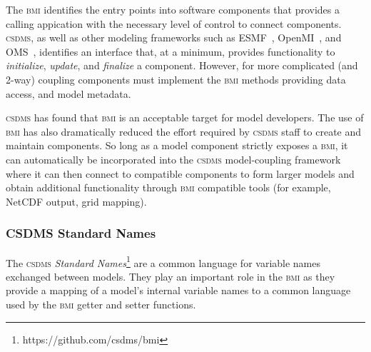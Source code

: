 \documentclass[11pt, oneside]{amsart}
\newcommand{\huttonnote}[1]{ {\textcolor{magenta}    { ***Eric:      #1 }}}
\DeclareRobustCommand{\csdms}{\textsc{csdms}}
\DeclareRobustCommand{\bmi}{\textsc{bmi}}
\begin{document}
The \bmi{} identifies the entry points into software components that provides a
calling appication with the necessary level of control to connect components.
\csdms, as well as other modeling frameworks such as
ESMF~\cite{hill2004architecture}, OpenMI~\cite{gregersen2007openmi}, and
OMS~\cite{david2002object}, identifies an interface that, at a minimum,
provides functionality to \emph{initialize}, \emph{update}, and
\emph{finalize} a component. However, for more complicated (and 2-way)
coupling components must implement the \bmi{} methods providing data access,
and model metadata.

\csdms{} has found that \bmi{} is an acceptable target for model developers.
The use of \bmi{} has also dramatically reduced the effort required by
\csdms{} staff to create and maintain components. So long as a model component
strictly exposes a \bmi{}, it can automatically be incorporated into the
\csdms{} model-coupling framework where it can then connect to compatible
components to form larger models and obtain additional functionality through
\bmi{} compatible tools (for example, NetCDF output, grid mapping).



\subsubsection{CSDMS Standard Names}
\label{sec:standardnames}


The \csdms{} \emph{Standard Names}\footnote{https://github.com/csdms/bmi}
are a common language for variable names exchanged between models. They play
an important role in the \bmi{} as they provide a mapping of a model's
internal variable names to a common language used by the \bmi{} getter and
setter functions.
\end{document}
